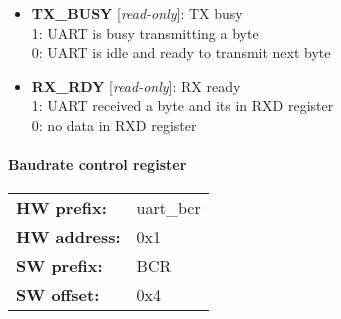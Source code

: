 \vspace{12pt}
\noindent
{}

\begin{itemize}
\item \begin{small}
{\bf 
TX\_BUSY
} [\emph{read-only}]: TX busy
\\
1: UART is busy transmitting a byte\\0: UART is idle and ready to transmit next byte
\end{small}
\item \begin{small}
{\bf 
RX\_RDY
} [\emph{read-only}]: RX ready
\\
1: UART received a byte and its in RXD register\\0: no data in RXD register
\end{small}
\end{itemize}
\paragraph*{Baudrate control register}\vspace{12pt}

\begin{tabular}{l l }
{\bf HW prefix:}  & uart\_bcr\\
{\bf HW address:}  & 0x1\\
{\bf SW prefix:}  & BCR\\
{\bf SW offset:}  & 0x4\\
\end{tabular}

